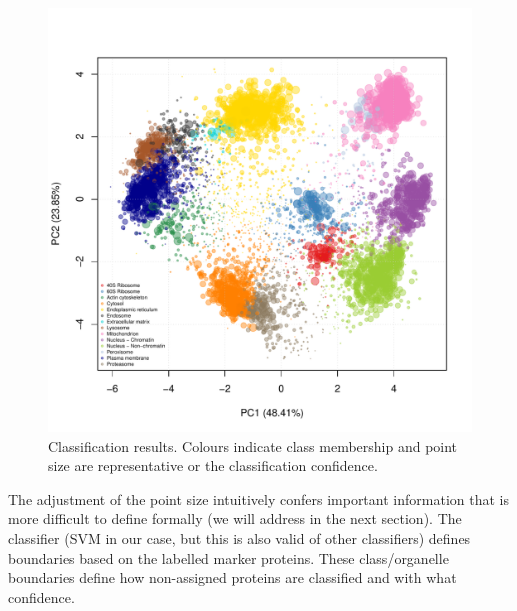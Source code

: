 \begin{figure}[!ht]
  \centering
\begin{knitrout}
\color{fgcolor}\begin{kframe}
\begin{alltt}
 \hlkwb{<-} \hlstd{(}\hlopt{$} \hlopt{-} 
  \hlstd{=} \hlstd{,}  
  \hlstd{=} \hlstd{,}  \hlstd{=} \hlstd{,}  \hlstd{=} \hlstd{,}  \hlstd{=} \hlstd{)}
\end{alltt}
\end{kframe}
\includegraphics[width=.8\textwidth]{figure/plotSVM-1} 

\end{knitrout}
\caption{Classification results. Colours indicate class membership and
  point size are representative or the classification confidence.}
  \label{fig:plotSVM}
\end{figure}


The adjustment of the point size intuitively confers important
information that is more difficult to define formally (we
will address in the next section). The classifier (SVM in our case, but
this is also valid of other classifiers) defines boundaries based on
the labelled marker proteins. These class/organelle boundaries define
how non-assigned proteins are classified and with what confidence.

